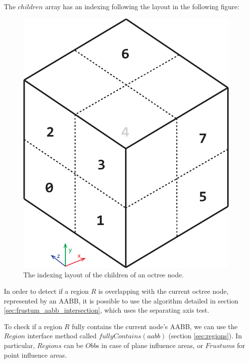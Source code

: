 \documentclass{PoliMi_MasterThesis}
\begin{document}
The $children$ array has an indexing following the layout in the following figure:

\begin{figure}[H]
	\centering
	\includegraphics[width=\textwidth*\real{0.4}]{Images/octree_node_layout.png}
	\caption{The indexing layout of the children of an octree node.}
	\label{fig:octree_children_layout}
\end{figure}

In order to detect if a region $R$ is overlapping with the current octree node, represented by an AABB, it is possible to use the algorithm detailed in section \ref{sec:frustum_aabb_intersection}, which uses the separating axis test.

To check if a region $R$ fully contains the current node's AABB, we can use the $Region$ interface method called $fullyContains(aabb)$ (section \ref{sec:regions}). In particular, $Regions$ can be $Obb$s in case of plane influence areas, or $Frustum$s for point influence areas.
\end{document}
